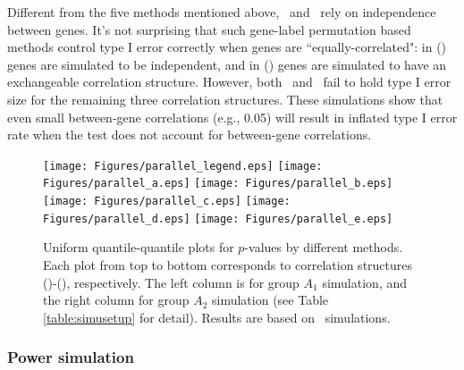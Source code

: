 	Different from the five methods mentioned above, \gent~and \genr~rely on independence between
	genes. It's not surprising that such gene-label permutation based methods control type I
	error correctly when genes are ``equally-correlated": in (\aaCase) genes are simulated to be
	independent, and in (\cCase) genes are simulated to have an exchangeable correlation structure.
	However, both \gent~and \genr~fail to hold type I error size for the remaining three correlation
	structures. These simulations show that even small between-gene correlations (e.g., 0.05) will 
	result in inflated type I error rate when the test does not account for between-gene 
	correlations.  
	
	
	
	\begin{figure}[!ht]
		\begin{center}
			\texttt{[image: Figures/parallel\_legend.eps]}
			\texttt{[image: Figures/parallel\_a.eps]}
			\texttt{[image: Figures/parallel\_b.eps]}
			\texttt{[image: Figures/parallel\_c.eps]}
			\texttt{[image: Figures/parallel\_d.eps]}
			\texttt{[image: Figures/parallel\_e.eps]}
		\end{center} 
		\caption[Uniform quantile-quantile plots for $p$-values by different methods]{Uniform 
		quantile-quantile plots for $p$-values by different methods. Each plot 
		from top to bottom corresponds to correlation structures (\aaCase)-(\fCase), respectively. 
		The left column is for group $A_1$ simulation, and the right column for group $A_2$ 
		simulation (see Table \ref{table:simusetup} for detail). Results are based on
		\HowmanySimu~simulations.}\label{fig:typeIerror}
	\end{figure} 
	
	
	\subsubsection{Power simulation}\label{subsection:power}		 
	
